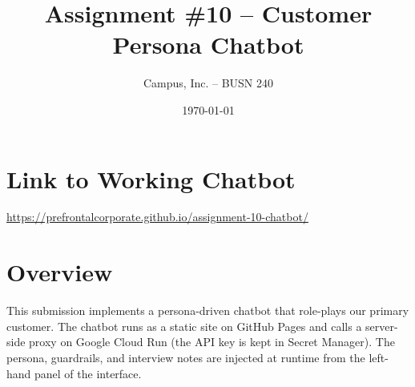 \documentclass[11pt]{article}
\title{Assignment \#10 -- Customer Persona Chatbot}
\author{Campus, Inc. -- BUSN 240}
\date{\today}
\begin{document}
\maketitle

\section*{Link to Working Chatbot}
\href{https://prefrontalcorporate.github.io/assignment-10-chatbot/}{https://prefrontalcorporate.github.io/assignment-10-chatbot/}

\section*{Overview}
This submission implements a persona-driven chatbot that role-plays our primary customer. The chatbot runs as a static site on GitHub Pages and calls a server-side proxy on Google Cloud Run (the API key is kept in Secret Manager). The persona, guardrails, and interview notes are injected at runtime from the left-hand panel of the interface.
\end{document}
